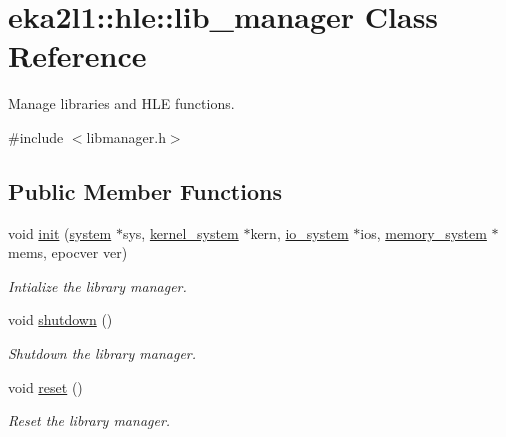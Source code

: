 \hypertarget{classeka2l1_1_1hle_1_1lib__manager}{}\section{eka2l1\+:\+:hle\+:\+:lib\+\_\+manager Class Reference}
\label{classeka2l1_1_1hle_1_1lib__manager}


Manage libraries and H\+LE functions.  




{\ttfamily \#include $<$libmanager.\+h$>$}

\subsection*{Public Member Functions}
\begin{DoxyCompactItemize}
\item 
void \mbox{\hyperlink{classeka2l1_1_1hle_1_1lib__manager_a0def103095f212354c88c41f6746f90c}{init}} (\mbox{\hyperlink{classeka2l1_1_1system}{system}} $\ast$sys, \mbox{\hyperlink{classeka2l1_1_1kernel__system}{kernel\+\_\+system}} $\ast$kern, \mbox{\hyperlink{classeka2l1_1_1io__system}{io\+\_\+system}} $\ast$ios, \mbox{\hyperlink{classeka2l1_1_1memory__system}{memory\+\_\+system}} $\ast$mems, epocver ver)
\begin{DoxyCompactList}\small\item\em Intialize the library manager. \end{DoxyCompactList}\item 
\mbox{\label{classeka2l1_1_1hle_1_1lib__manager_ac781d05b6f5a379288cf4b498c7bf265}} 
void \mbox{\hyperlink{classeka2l1_1_1hle_1_1lib__manager_ac781d05b6f5a379288cf4b498c7bf265}{shutdown}} ()
\begin{DoxyCompactList}\small\item\em Shutdown the library manager. \end{DoxyCompactList}\item 
\mbox{\label{classeka2l1_1_1hle_1_1lib__manager_addb8bb832cb3b89be71ebdedc3419cef}} 
void \mbox{\hyperlink{classeka2l1_1_1hle_1_1lib__manager_addb8bb832cb3b89be71ebdedc3419cef}{reset}} ()
\begin{DoxyCompactList}\small\item\em Reset the library manager. \end{DoxyCompactList}\item 

\end{DoxyCompactItemize}
